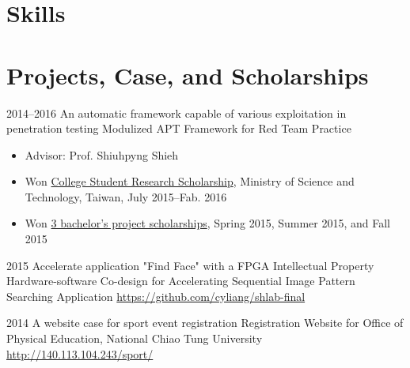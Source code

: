 \documentclass[11pt,a4paper,sans,english]{moderncv}
\begin{document}
\section{Skills}
        
\section{Projects, Case, and Scholarships}
    \cventry
        {2014--2016} %
        {An automatic framework capable of various exploitation in penetration testing} %
        {Modulized APT Framework for Red Team Practice} %
        {}
        {} %
        {\begin{itemize}
        \item Advisor: Prof. Shiuhpyng Shieh
        \item Won \underline{College Student Research Scholarship}, Ministry of Science and Technology, Taiwan, July 2015--Fab. 2016
        \item Won \underline{3 bachelor's project scholarships}, Spring 2015, Summer 2015, and Fall 2015
        \end{itemize}%
        }
        
    \cventry
        {2015}
        {Accelerate application "Find Face" with a FPGA Intellectual Property}
        {Hardware-software Co-design for Accelerating Sequential Image Pattern Searching Application}
        {}
        {\href{https://github.com/cyliang/shlab-final}{\textnormal{https://github.com/cyliang/shlab-final}}}
        {}

        
    \cventry
        {2014}
        {A website case for sport event registration}
        {Registration Website for Office of Physical Education, National Chiao Tung University}
        {}
        {\href{http://140.113.104.243/sport/}{\textnormal{http://140.113.104.243/sport/}}}
        {}
        
\end{document}
